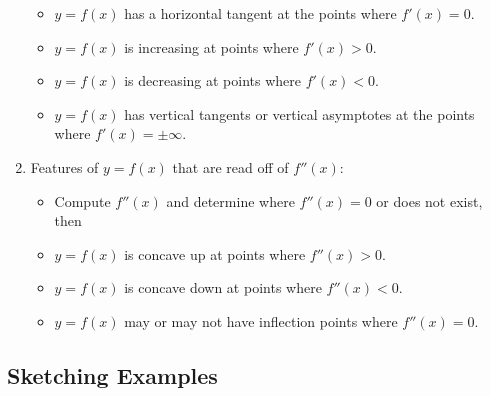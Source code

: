 \begin{enumerate}[(1)]
\begin{itemize}
\item $y=f(x)$ has a horizontal tangent at the points where $f'(x)=0$.

\item $y=f(x)$ is increasing at points where $f'(x)>0$.

\item $y=f(x)$ is decreasing at points where $f'(x)<0$.

\item $y=f(x)$ has vertical tangents or vertical asymptotes at the points
where $f'(x)=\pm\infty$.
\end{itemize}


\item Features of $y=f(x)$ that are read off of $f''(x)$:
\begin{itemize}
\item Compute $f''(x)$ and determine where $f''(x)=0$ or does not exist, then

\item $y=f(x)$ is concave up at points where $f''(x)>0$.

\item $y=f(x)$ is concave down at points where $f''(x)<0$.

\item $y=f(x)$ may or may not have inflection points where $f''(x)=0$.

\end{itemize}
\end{enumerate}

\subsection{Sketching Examples}\label{ssec_sketch_SE}

